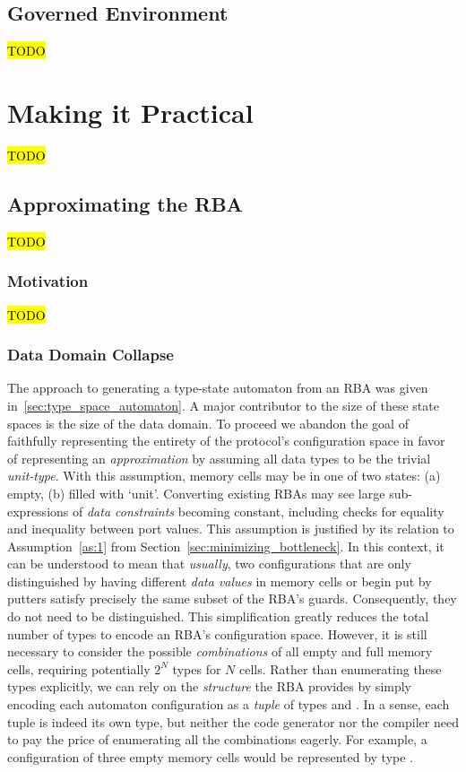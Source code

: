 \subsection{Governed Environment}
\hl{TODO}

\section{Making it Practical}
\hl{TODO}

\subsection{Approximating the RBA}
\hl{TODO}
\subsubsection{Motivation}
\hl{TODO}

\subsubsection{Data Domain Collapse}
\label{sec:approximating_rba}
The approach to generating a type-state automaton from an RBA was given in~\ref{sec:type_space_automaton}. A major contributor to the size of these state spaces is the size of the data domain. To proceed we abandon the goal of faithfully representing the entirety of the protocol's configuration space in favor of representing an \textit{approximation} by assuming all data types to be the trivial \textit{unit-type}. With this assumption, memory cells may be in one of two states: (a) empty, (b) filled with `unit'. Converting existing RBAs may see large sub-expressions of \textit{data constraints} becoming constant, including checks for equality and inequality between port values. This assumption is justified by its relation to Assumption~\ref{as:1} from Section~\ref{sec:minimizing_bottleneck}. In this context, it can be understood to mean that \textit{usually}, two configurations that are only distinguished by having different \textit{data values} in memory cells or begin put by putters satisfy precisely the same subset of the RBA's guards. Consequently, they do not need to be distinguished. This simplification greatly reduces the total number of types to encode an RBA's configuration space. However, it is still necessary to consider the possible \textit{combinations} of all empty and full memory cells, requiring potentially $2^N$ types for $N$ cells. Rather than enumerating these types explicitly, we can rely on the \textit{structure} the RBA provides by simply encoding each automaton configuration as a \textit{tuple} of types  and . In a sense, each tuple is indeed its own type, but neither the code generator nor the compiler need to pay the price of enumerating all the combinations eagerly. For example, a configuration of three empty memory cells would be represented by type .


